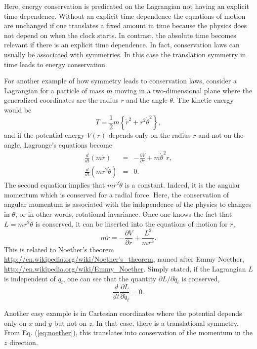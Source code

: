 Here, energy conservation is predicated on the Lagrangian not having
an explicit time dependence. Without an explicit time dependence the
equations of motion are unchanged if one translates a fixed amount in
time because the physics does not depend on when the clock starts. In
contrast, the absolute time becomes relevant if there is an explicit
time dependence. In fact, conservation laws can usually be associated
with symmetries. In this case the translation symmetry in time leads
to energy conservation.

For another example of how symmetry leads to conservation laws,
consider a Lagrangian for a particle of mass $m$ moving in a
two-dimensional plane where the generalized coordinates are the radius
$r$ and the angle $\theta$. The kinetic energy would be
\begin{equation}
T=\frac{1}{2}m\left\{\dot{r}^2+r^2\dot{\theta}^2\right\},
\end{equation}
and if the potential energy $V(r)$ depends only on the radius $r$ and
not on the angle, Lagrange's equations become
\begin{eqnarray}
\frac{d}{dt}(m\dot{r})&=&-\frac{\partial V}{\partial
  r}+m\dot{\theta}^2r,\\ \nonumber \frac{d}{dt}(mr^2\dot{\theta})&=&0.
\end{eqnarray}
The second equation implies that $mr^2\dot{\theta}$ is a
constant. Indeed, it is the angular momentum which is conserved for a
radial force. Here, the conservation of angular momentum is associated
with the independence of the physics to changes in $\theta$, or in
other words, rotational invariance. Once one knows the fact that
$L=mr^2\dot{\theta}$ is conserved, it can be inserted into the
equations of motion for $\dot{r}$,
\begin{equation}
m\ddot{r}=-\frac{\partial V}{\partial r}+\frac{L^2}{mr^3}.
\end{equation}
This is related to Noether's theorem
\href{http://en.wikipedia.org/wiki/Noether's_theorem}{http://en.wikipedia.org/wiki/Noether's\_theorem},
named after Emmy Noether,
\href{http://en.wikipedia.org/wiki/Emmy_Noether}{http://en.wikipedia.org/wiki/Emmy\_Noether}. Simply
stated, if the Lagrangian $L$ is independent of $q_i$, one can see
that the quantity $\partial L/\partial\dot{q}_i$ is conserved,
\begin{equation}
\label{eq:noether}
\frac{d}{dt}\frac{\partial L}{\partial\dot{q}_i}=0.
\end{equation}

Another easy example is in Cartesian coordinates where the potential
depends only on $x$ and $y$ but not on $z$. In that case, there is a
translational symmetry. From Eq. (\ref{eq:noether}), this translates
into conservation of the momentum in the $z$ direction.

